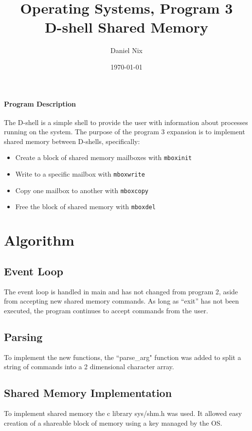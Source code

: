 \title{Operating Systems, Program 3 \\ D-shell Shared Memory}
\author{Daniel Nix}
\date{\today}


\begin{multicols}{2}

\paragraph{Program Description}
The D-shell is a simple shell to provide the user with information about processes running on the system. The purpose of the program 3 expansion is to implement shared memory between D-shells, specifically:
\begin{itemize}
\item 	Create a block of shared memory mailboxes with \texttt{mboxinit}

\item	Write to a specific mailbox with \texttt{mboxwrite}

\item	Copy one mailbox to another with \texttt{mboxcopy}

\item	Free the block of shared memory with \texttt{mboxdel}
\end{itemize}

\section{Algorithm}\label{algorithm}
\subsection{Event Loop}\label{event_loop}
The event loop is handled in main and has not changed from program 2, aside from accepting new shared memory commands. As long as ``exit'' has not been executed, the program continues to accept commands from the user. 

\subsection{Parsing}
To implement the new functions, the ``parse\_arg" function was added to split a string of commands into a 2 dimensional character array.

\subsection{Shared Memory Implementation}
To implement shared memory the c library sys/shm.h was used. It allowed easy creation of a shareable block of memory using a key managed by the OS. 


\end{multicols}
